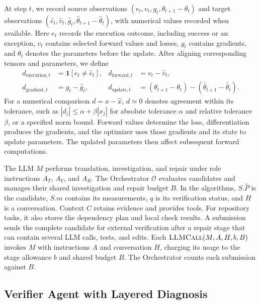 \documentclass{article}
\begin{document}
At step $t$, we record source observations $(e_t,v_t,g_t,\theta_{t+1}-\theta_t)$ and target observations $(\hat e_t,\hat v_t,\hat g_t,\hat\theta_{t+1}-\hat\theta_t)$, with numerical values recorded when available. Here $e_t$ records the execution outcome, including success or an exception, $v_t$ contains selected forward values and losses, $g_t$ contains gradients, and $\theta_t$ denotes the parameters before the update. After aligning corresponding tensors and parameters, we define
\begin{align}
d_{\mathrm{execution},t}&=\mathbf{1}[e_t\ne\hat e_t], &
d_{\mathrm{forward},t}&=v_t-\hat v_t,\\
d_{\mathrm{gradient},t}&=g_t-\hat g_t, &
d_{\mathrm{update},t}&=(\theta_{t+1}-\theta_t)-(\hat\theta_{t+1}-\hat\theta_t).
\end{align}
For a numerical comparison $d=x-\hat x$, $d\simeq0$ denotes agreement within its tolerance, such as $|d_j|\leq\alpha+\beta|x_j|$ for absolute tolerance $\alpha$ and relative tolerance $\beta$, or a specified norm bound. Forward values determine the loss, differentiation produces the gradients, and the optimizer uses those gradients and its state to update parameters. The updated parameters then affect subsequent forward computations.

The LLM $M$ performs translation, investigation, and repair under role instructions $A_T$, $A_V$, and $A_R$. The Orchestrator $\mathcal O$ evaluates candidates and manages their shared investigation and repair budget $B$. In the algorithms, $S.\hat P$ is the candidate, $S.m$ contains its measurements, $q$ is its verification status, and $H$ is a conversation. Context $C$ retains evidence and provides tools. For repository tasks, it also stores the dependency plan and local check results. A submission sends the complete candidate for external verification after a repair stage that can contain several LLM calls, tests, and edits. Each $\textsc{LLMCall}(M,A,H,b,B)$ invokes $M$ with instructions $A$ and conversation $H$, charging its usage to the stage allowance $b$ and shared budget $B$. The Orchestrator counts each submission against $B$.

\subsection{Verifier Agent with Layered Diagnosis}
\label{sec:hierarchy}
\end{document}
